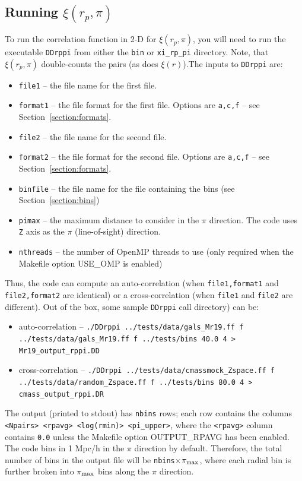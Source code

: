 \documentclass[12pt,titlepage]{article}
\newcommand{\xir}{\ensuremath{{\xi(r)}}\xspace}
\newcommand{\xirppi}{\ensuremath{{\xi(r_p,\pi)}}\xspace}
\newcommand{\pimax}{\ensuremath{{\pi_{\rm max}}}\xspace}
\begin{document}
\subsection{Running \texorpdfstring{\xirppi}{xi(rp,pi)}}
To run the correlation function in 2-D for \xirppi, you will need to run the executable \texttt{DDrppi} from either the \texttt{bin} or \texttt{xi\_rp\_pi} directory. Note, that 
\xirppi double-counts the pairs (as does \xir).The inputs 
to \texttt{DDrppi} are:
\begin{itemize}
\item \texttt{file1}   -- the file name for the first file.
\item \texttt{format1} -- the file format for the first file. Options are \texttt{a,c,f} -- see Section~\ref{section:formats}.
\item \texttt{file2}   -- the file name for the second file.
\item \texttt{format2} -- the file format for the second file. Options are \texttt{a,c,f} -- see Section~\ref{section:formats}.
\item \texttt{binfile} -- the file name for the file containing the bins (see Section~\ref{section:bins})
\item \texttt{pimax}   -- the maximum distance to consider in the $\pi$ direction. The code uses \texttt{Z} axis as the $\pi$ (line-of-sight) direction. 
\item \texttt{nthreads} -- the number of OpenMP threads to use (only required when the Makefile option USE\_OMP is enabled)
\end{itemize}
Thus, the code can compute an auto-correlation (when \texttt{file1,format1} and \texttt{file2,format2} are identical) or a cross-correlation (when \texttt{file1} and \texttt{file2} are different). Out of the box, 
some sample \texttt{DDrppi} call directory) can be:
\begin{itemize}
\item auto-correlation --  {\scriptsize \texttt{./DDrppi  ../tests/data/gals\_Mr19.ff f ../tests/data/gals\_Mr19.ff f ../tests/bins 40.0 4 > Mr19\_output\_rppi.DD}}
\item cross-correlation -- {\scriptsize \texttt{./DDrppi ../tests/data/cmassmock\_Zspace.ff f ../tests/data/random\_Zspace.ff f ../tests/bins 80.0 4 > cmass\_output\_rppi.DR}}
\end{itemize}
The output (printed to stdout) has \texttt{nbins} rows; each row contains the columns \texttt{<Npairs> <rpavg> <log(rmin)> <pi\_upper>}, where the \texttt{<rpavg>} column contains \texttt{0.0} unless the 
Makefile option OUTPUT\_RPAVG has been enabled. The code bins in 1 Mpc/h in the $\pi$ direction by default. Therefore, 
the total number of bins in the output file will be \texttt{nbins$\times$\pimax}, where each radial bin is further broken into \pimax bins along the 
$\pi$ direction. 
\end{document}
